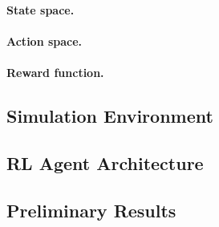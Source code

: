\documentclass{article}
\begin{document}

\paragraph{State space.}

\paragraph{Action space.}

\paragraph{Reward function.}

\subsection{Simulation Environment}

\subsection{RL Agent Architecture}


\subsection{Preliminary Results}

\end{document}
